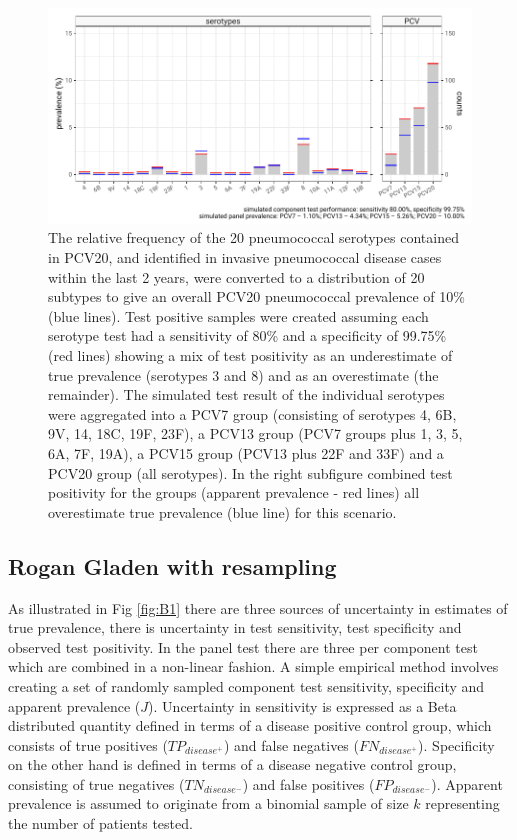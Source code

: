 \documentclass[a4paper, 12pt, twoside]{article}
\let\Oldsubsection\subsection
\renewcommand{\subsection}{\FloatBarrier\Oldsubsection}
\begin{document}
\begin{figure}[h!]
\centering
  \includegraphics{fig/simulation_setup_prev_10_v2}
  \caption{The relative frequency of the 20 pneumococcal serotypes contained in PCV20, and identified in invasive pneumococcal disease cases within the last 2 years, were converted to a distribution of 20 subtypes to give an overall PCV20 pneumococcal prevalence of 10\% (blue lines). Test positive samples were created assuming each serotype test had a sensitivity of 80\% and a specificity of 99.75\% (red lines) showing a mix of test positivity as an underestimate of true prevalence (serotypes 3 and 8) and as an overestimate (the remainder). The simulated test result of the individual serotypes were aggregated into a PCV7 group (consisting of serotypes 4, 6B, 9V, 14, 18C, 19F, 23F), a PCV13 group (PCV7 groups plus 1, 3, 5, 6A, 7F, 19A), a PCV15 group (PCV13 plus 22F and 33F) and a PCV20 group (all serotypes). In the right subfigure combined test positivity for the groups (apparent prevalence - red lines) all overestimate true prevalence (blue line) for this scenario.}
\label{fig:B2}
\end{figure}

\subsection{Rogan Gladen with resampling}

As illustrated in Fig \ref{fig:B1} there are three sources of uncertainty in estimates of true prevalence, there is uncertainty in test sensitivity, test specificity and observed test positivity. In the panel test there are three per component test which are combined in a non-linear fashion. A simple empirical method involves creating a set of randomly sampled component test sensitivity, specificity and apparent prevalence (\(J\)). Uncertainty in sensitivity is expressed as a Beta distributed quantity defined in terms of a disease positive control group, which consists of true positives (\(TP_{disease^+}\)) and false negatives (\(FN_{disease^+}\)). Specificity on the other hand is defined in terms of a disease negative control group, consisting of true negatives (\(TN_{disease^-}\)) and false positives (\(FP_{disease^-}\)). Apparent prevalence is assumed to originate from a binomial sample of size \(k\) representing the number of patients tested.
\end{document}
